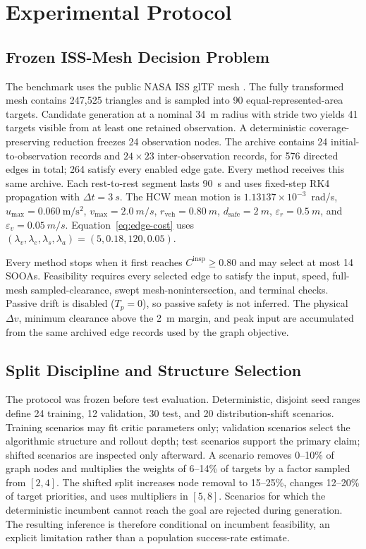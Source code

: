 \documentclass{IEEEtaes}
\newcommand{\dt}{\Delta t}
\newcommand{\unit}[2]{#1~#2}
\theoremstyle{remark}
\theoremstyle{plain}
\begin{document}
\section{Experimental Protocol}
\label{sec:simulation}

\subsection{Frozen ISS-Mesh Decision Problem}

The benchmark uses the public NASA ISS glTF mesh \cite{nasa_iss_gltf_model}. The fully transformed mesh contains 247,525 triangles and is sampled into 90 equal-represented-area targets. Candidate generation at a nominal \unit{34}{m} radius with stride two yields 41 targets visible from at least one retained observation. A deterministic coverage-preserving reduction freezes 24 observation nodes. The archive contains 24 initial-to-observation records and $24\times23$ inter-observation records, for 576 directed edges in total; 264 satisfy every enabled edge gate. Every method receives this same archive. Each rest-to-rest segment lasts \unit{90}{s} and uses fixed-step RK4 propagation with $\dt=\unit{3}{s}$. The HCW mean motion is $1.13137\times10^{-3}$~rad/s, $u_{\max}=0.060~\mathrm{m/s^2}$, $v_{\max}=\unit{2.0}{m/s}$, $r_{\mathrm{veh}}=\unit{0.80}{m}$, $d_{\mathrm{safe}}=\unit{2}{m}$, $\varepsilon_r=\unit{0.5}{m}$, and $\varepsilon_v=\unit{0.05}{m/s}$. Equation~\eqref{eq:edge-cost} uses $(\lambda_v,\lambda_e,\lambda_s,\lambda_a)=(5,0.18,120,0.05)$.

Every method stops when it first reaches $C^{\mathrm{insp}}\ge0.80$ and may select at most 14 SOOAs. Feasibility requires every selected edge to satisfy the input, speed, full-mesh sampled-clearance, swept mesh-nonintersection, and terminal checks. Passive drift is disabled ($T_p=0$), so passive safety is not inferred. The physical $\Delta v$, minimum clearance above the \unit{2}{m} margin, and peak input are accumulated from the same archived edge records used by the graph objective.

\subsection{Split Discipline and Structure Selection}

The protocol was frozen before test evaluation. Deterministic, disjoint seed ranges define 24 training, 12 validation, 30 test, and 20 distribution-shift scenarios. Training scenarios may fit critic parameters only; validation scenarios select the algorithmic structure and rollout depth; test scenarios support the primary claim; shifted scenarios are inspected only afterward. A scenario removes 0--10\% of graph nodes and multiplies the weights of 6--14\% of targets by a factor sampled from $[2,4]$. The shifted split increases node removal to 15--25\%, changes 12--20\% of target priorities, and uses multipliers in $[5,8]$. Scenarios for which the deterministic incumbent cannot reach the goal are rejected during generation. The resulting inference is therefore conditional on incumbent feasibility, an explicit limitation rather than a population success-rate estimate.
\end{document}
